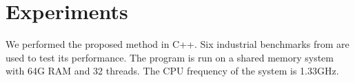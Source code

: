 \section{Experiments}
We performed the proposed method in C++. Six industrial benchmarks from \cite{IBM} are used to test its performance. The
program is run on a shared memory system with 64G RAM and 32 threads. The CPU frequency of the system is 1.33GHz. 

